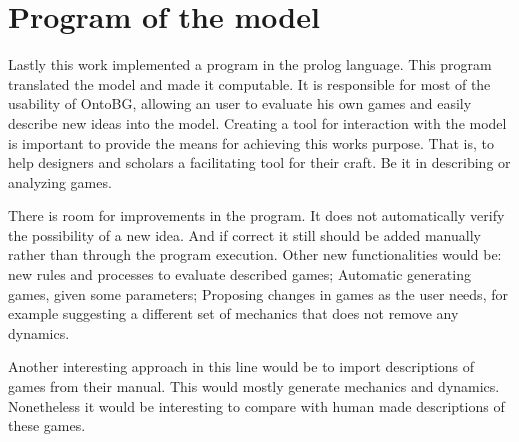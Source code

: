 \section{Program of the model}

Lastly this work implemented a program in the prolog language. This program translated the model and made it computable. It is responsible for most of the usability of OntoBG, allowing an user to evaluate his own games and easily describe new ideas into the model. Creating a tool for interaction with the model is important to provide the means for achieving this works purpose. That is, to help designers and scholars a facilitating tool for their craft. Be it in describing or analyzing games.

There is room for improvements in the program. It does not automatically verify the possibility of a new idea. And if correct it still should be added manually rather than through the program execution. Other new functionalities would be: new rules and processes to evaluate described games; Automatic generating games, given some parameters; Proposing changes in games as the user needs, for example suggesting a different set of mechanics that does not remove any dynamics.

Another interesting approach in this line would be to import descriptions of games from their manual. This would mostly generate mechanics and dynamics. Nonetheless it would be interesting to compare with human made descriptions of these games.